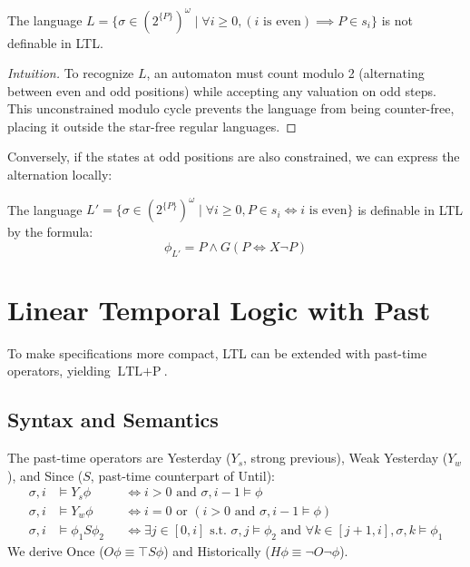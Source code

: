 \begin{proposition}
The language $L = \{ \sigma \in (2^{\{P\}})^{\omega} \mid \forall i \ge 0, (i \text{ is even}) \implies P \in s_i \}$ is not definable in LTL.
\end{proposition}
\begin{proof}[Intuition]
To recognize $L$, an automaton must count modulo 2 (alternating between even and odd positions) while accepting any valuation on odd steps. This unconstrained modulo cycle prevents the language from being counter-free, placing it outside the star-free regular languages.
\end{proof}

Conversely, if the states at odd positions are also constrained, we can express the alternation locally:
\begin{proposition}
The language $L' = \{ \sigma \in (2^{\{P\}})^{\omega} \mid \forall i \ge 0, P \in s_i \iff i \text{ is even} \}$ is definable in LTL by the formula:
\[
  \phi_{L'} = P \land G (P \iff X \neg P)
\]
\end{proposition}

\section{Linear Temporal Logic with Past}
\label{sec:ltl-past}

To make specifications more compact, LTL can be extended with past-time operators, yielding $\text{LTL}+\text{P}$.

\subsection{Syntax and Semantics}
The past-time operators are Yesterday ($Y_s$, strong previous), Weak Yesterday ($Y_w$), and Since ($S$, past-time counterpart of Until):
\begin{align*}
  \sigma, i &\models Y_s \phi &&\iff i > 0 \text{ and } \sigma, i-1 \models \phi \\
  \sigma, i &\models Y_w \phi &&\iff i = 0 \text{ or } (i > 0 \text{ and } \sigma, i-1 \models \phi) \\
  \sigma, i &\models \phi_1 S \phi_2 &&\iff \exists j \in [0, i] \text{ s.t. } \sigma, j \models \phi_2 \text{ and } \forall k \in [j+1, i], \sigma, k \models \phi_1
\end{align*}
We derive Once ($O \phi \equiv \top S \phi$) and Historically ($H \phi \equiv \neg O \neg \phi$).

